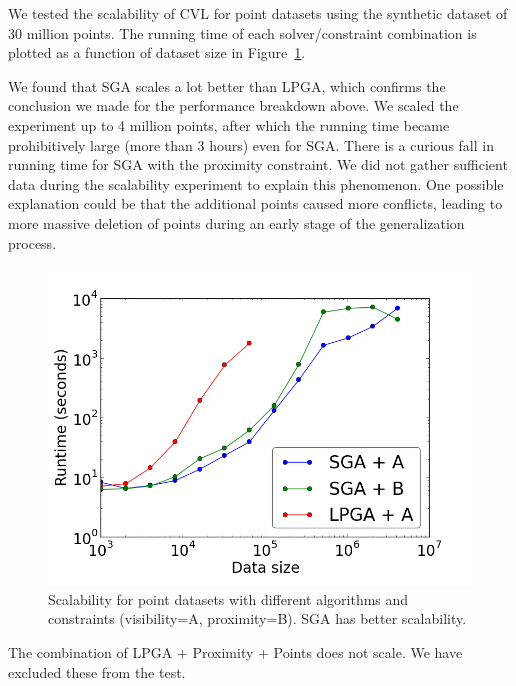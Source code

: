 


We tested the scalability of CVL for point datasets using the synthetic dataset of 30 million points. The running time of each solver/constraint combination is plotted as a function of dataset size in Figure~\ref{fig:scalability:points}.

We found that SGA scales a lot better than LPGA, which confirms the conclusion we made for the performance breakdown above. We scaled the experiment up to 4 million points, after which the running time became prohibitively large (more than 3 hours) even for SGA. There is a curious fall in running time for SGA with the proximity constraint. We did not gather sufficient data during the scalability experiment to explain this phenomenon. One possible explanation could be that the additional points caused more conflicts, leading to more massive deletion of points during an early stage of the generalization process.

\begin{figure}[htbp]
\begin{center}
\includegraphics[width=1.0\linewidth]{./figs/scal_pnt_30m_synthetic.png}
\caption{Scalability for point datasets with different algorithms and constraints (visibility=A, proximity=B). SGA has better scalability.}
\label{fig:scalability:points}
\end{center}
\end{figure}

The combination of LPGA + Proximity + Points does not scale. We have excluded these from the test.

